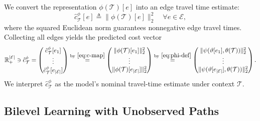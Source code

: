 \documentclass[11pt, letterpaper, oneside, reqno]{amsart}
\newcommand{\R}{\mathbb{R}}
\newcommand{\Let}{\triangleq}
\begin{document}
We convert the representation $\phi(\mathcal T)[e]$ into an edge travel time estimate:
\begin{equation}
\hat c_{\mathcal T}^\phi[e] \Let \bigl\|\phi(\mathcal T)[e]\bigr\|_2^2 \quad \forall e \in \mathcal E,
\label{eq:c-map}
\end{equation}
where the squared Euclidean norm guarantees nonnegative edge travel times.
Collecting all edges yields the predicted cost vector
\begin{equation} \label{eq:c-def}
\R_+^{|\mathcal E|} \ni \hat c_{\mathcal T}^\phi 
= \begin{pmatrix}
    \hat c_{\mathcal T}^\phi[e_1] \\
    \vdots \\
    \hat c_{\mathcal T}^\phi[e_{|\mathcal E|}] 
\end{pmatrix} 
\stackrel{\text{by}~\eqref{eq:c-map}}{=} 
\begin{pmatrix}
    \| \phi(\mathcal T)[e_1] \|_2^2\\
    \vdots \\
    \| \phi(\mathcal T)[e_{|\mathcal E|}] \|_2^2
\end{pmatrix}
\stackrel{\text{by}~\eqref{eq:phi-def}}{=}
\begin{pmatrix}
    \| \psi(\vartheta[e_1],  \theta (\mathcal T) ) \|_2^2 \\
    \vdots \\
    \| \psi(\vartheta[e_{|\mathcal E|}],  \theta (\mathcal T) ) \|_2^2
\end{pmatrix}.
\end{equation}
We interpret $\hat c_{\mathcal T}^\phi$ as the model's nominal travel-time estimate under context $\mathcal T$.

\subsection{Bilevel Learning with Unobserved Paths}
\label{sec:bilevel}
\end{document}
